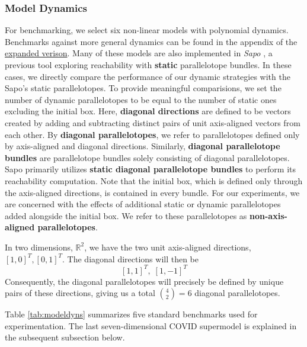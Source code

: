 \subsubsection{Model Dynamics}
For benchmarking, we select six non-linear models with polynomial dynamics. Benchmarks against more general dynamics can be found in the appendix of the \href{https://arxiv.org/abs/2105.11796}{expanded verison}. Many of these models are also implemented in \emph{Sapo} \cite{dreossi2017sapo}, a previous tool exploring reachability with {\bf static} parallelotope bundles. In these cases, we directly compare the performance of our dynamic strategies with the Sapo's static parallelotopes. To provide meaningful comparisions, we set the number of dynamic parallelotopes to be equal to the number of static ones excluding the initial box. Here, {\bf diagonal directions} are defined to be vectors created by adding and subtracting distinct pairs of unit axis-aligned vectors from each other. By {\bf diagonal parallelotopes}, we refer to parallelotopes defined only by axis-aligned and diagonal directions. Similarly, {\bf diagonal parallelotope bundles} are parallelotope bundles solely consisting of diagonal parallelotopes. Sapo primarily utilizes {\bf static diagonal parallelotope bundles} to perform its reachability computation.
Note that the initial box, which is defined only through the axis-aligned directions, is contained in every bundle.
%
For our experiments, we are concerned with the effects of additional static or dynamic parallelotopes added alongside the initial box. We refer to these parallelotopes as {\bf non-axis-aligned parallelotopes}.

\begin{example}
In two dimensions, $\mathbb{R}^2$, we have the two unit axis-aligned directions, $[1,0]^T, [0,1]^T$. The diagonal directions will then be
\[ [1,1]^T, \; [1,-1]^T\]
Consequently, the diagonal parallelotopes will precisely be defined by unique pairs of these directions, giving us a total ${4 \choose 2} = 6$ diagonal parallelotopes.
%
%
\end{example}
Table \ref{tab:modeldyns} summarizes five standard benchmarks used for experimentation. The last seven-dimensional COVID supermodel is explained in the subsequent subsection below.

